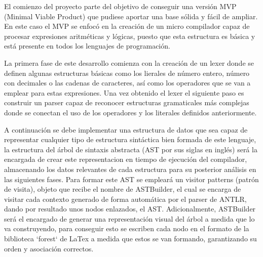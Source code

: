
El comienzo del proyecto parte del objetivo de conseguir una versión MVP (Minimal Viable Product) que pudiese aportar una base sólida y fácil de ampliar. En este caso el MVP se enfocó en la creación de un micro compilador capaz de procesar expresiones aritméticas y lógicas, puesto que esta estructura es básica y está presente en todos los lenguajes de programación.

La primera fase de este desarrollo comienza con la creación de un lexer donde se definen algunas estructuras básicas como los lierales de número entero, número con decimales o las cadenas de caracteres, así como los operadores que se van a emplear para estas expresiones. Una vez obtenido el lexer el siguiente paso es construir un parser capaz de reconocer estructuras gramaticales más complejas donde se conectan el uso de los operadores y los literales definidos anteriormente.

A continuación se debe implementar una estructura de datos que sea capaz de representar cualquier tipo de estructura sintáctica bien formada de este lenguaje, la estructura del árbol de sintaxis abstracta (AST por sus siglas en inglés) será la encargada de crear este representacion en tiempo de ejecución del compilador, almacenando los datos relevantes de cada estructura para su posterior análisis en las siguientes fases.
Para formar este AST se empleará un visitor patterns (patrón de visita), objeto que recibe el nombre de ASTBuilder, el cual se encarga de visitar cada contexto generado de forma automática por el parser de ANTLR, dando por resultado unos nodos enlazados, el AST. Adicionalmente, ASTBuilder será el encargado de generar una representación visual del árbol a medida que lo va construyendo, para conseguir esto se escriben cada nodo en el formato de la biblioteca `forest` de LaTex a medida que estos se van formando, garantizando su orden y asociación correctos.


